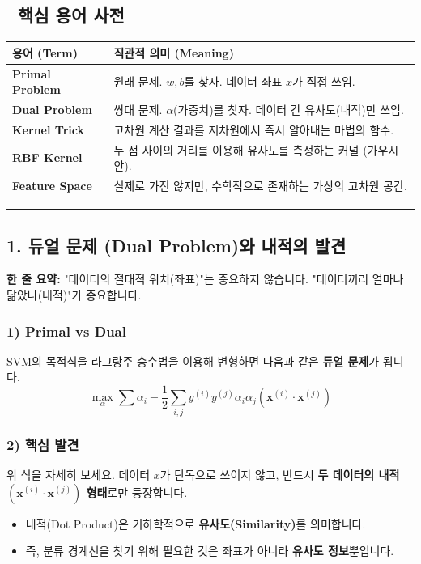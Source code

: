 \documentclass[11pt,a4paper]{book}
\theoremstyle{definition}
\begin{document}
\subsection*{📝 핵심 용어 사전}
\begin{table}[h]
\centering
\begin{tabularx}{\textwidth}{|p{}|X|}
\hline
\textbf{용어 (Term)} & \textbf{직관적 의미 (Meaning)} \\
\hline
\textbf{Primal Problem} & 원래 문제. $w, b$를 찾자. 데이터 좌표 $x$가 직접 쓰임. \\
\hline
\textbf{Dual Problem} & 쌍대 문제. $\alpha$(가중치)를 찾자. 데이터 간 유사도(내적)만 쓰임. \\
\hline
\textbf{Kernel Trick} & 고차원 계산 결과를 저차원에서 즉시 알아내는 마법의 함수. \\
\hline
\textbf{RBF Kernel} & 두 점 사이의 거리를 이용해 유사도를 측정하는 커널 (가우시안). \\
\hline
\textbf{Feature Space} & 실제로 가진 않지만, 수학적으로 존재하는 가상의 고차원 공간. \\
\hline
\end{tabularx}
\end{table}

\vspace{0.5cm}\hrule\vspace{0.5cm}

\subsection{1. 듀얼 문제 (Dual Problem)와 내적의 발견}

\begin{conceptbox}[title={개념 1: 관점의 전환}]
\textbf{한 줄 요약:} "데이터의 절대적 위치(좌표)"는 중요하지 않습니다. "데이터끼리 얼마나 닮았나(내적)"가 중요합니다.
\end{conceptbox}

\subsubsection*{1) Primal vs Dual}
SVM의 목적식을 라그랑주 승수법을 이용해 변형하면 다음과 같은 \textbf{듀얼 문제}가 됩니다.
$$ \max_{\alpha} \sum \alpha_i - \frac{1}{2} \sum_{i,j} y^{(i)} y^{(j)} \alpha_i \alpha_j (\mathbf{x}^{(i)} \cdot \mathbf{x}^{(j)}) $$
\subsubsection*{2) 핵심 발견}
위 식을 자세히 보세요. 데이터 $x$가 단독으로 쓰이지 않고, 반드시 \textbf{두 데이터의 내적 $(\mathbf{x}^{(i)} \cdot \mathbf{x}^{(j)})$ 형태}로만 등장합니다.
\begin{itemize}
    \item 내적(Dot Product)은 기하학적으로 \textbf{유사도(Similarity)}를 의미합니다.
    \item 즉, 분류 경계선을 찾기 위해 필요한 것은 좌표가 아니라 \textbf{유사도 정보}뿐입니다.
\end{itemize}
\end{document}

